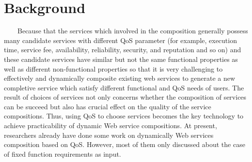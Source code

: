 \documentclass[senior,final,11pt]{iscs-thesis}
\begin{document}
\section{Background}
~~~~Because that the services which involved in the composition generally possess many candidate services with different QoS parameter (for example, execution time, service fee, availability, reliability, security, and reputation and so on\cite{zeng2003quality}) and these candidate services have similar but not the same functional properties as well as different non-functional properties so that it is very challenging to effectively and dynamically composite existing web services to generate a new completive service which satisfy different functional and QoS needs of users. The result of choices of services not only concerns whether the composition of services can be succeed but also has crucial effect on the quality of the service compositions.
Thus, using QoS to choose services becomes the key technology to achieve practicability of dynamic Web service compositions. At present, researchers already have done some work on dynamically Web services composition based on QoS. However, most of them only discussed about the case of fixed function requirements as input.
\end{document}
